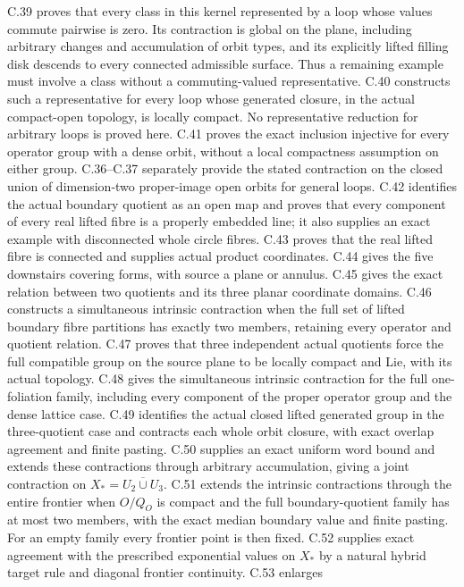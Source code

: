 C.39 proves that every class in this kernel represented by a loop
whose values commute pairwise is zero. Its contraction is global on
the plane, including arbitrary changes and accumulation of orbit types,
and its explicitly lifted filling disk descends to every connected
admissible surface. Thus a remaining example must involve a class
without a commuting-valued representative. C.40 constructs such a representative for every loop whose generated
closure, in the actual compact-open topology, is locally compact.
No representative reduction for arbitrary loops is proved here. C.41 proves the exact
inclusion injective for every operator group with a dense orbit,
without a local compactness assumption on either group. C.36--C.37 separately
provide the stated contraction on the closed union of dimension-two
proper-image open orbits for general loops. C.42 identifies the actual
boundary quotient as an open map and proves that every component of
every real lifted fibre is a properly embedded line; it also supplies
an exact example with disconnected whole circle fibres. C.43 proves
that the real lifted fibre is connected and supplies actual product
coordinates. C.44 gives the five downstairs covering forms, with
source a plane or annulus. C.45 gives the exact relation between two
quotients and its three planar coordinate domains. C.46 constructs a
simultaneous intrinsic contraction when the full set of lifted
boundary fibre partitions has exactly two members, retaining every
operator and quotient relation. C.47 proves that three independent
actual quotients force the full compatible group on the source plane
to be locally compact and Lie, with its actual topology. C.48 gives
the simultaneous intrinsic contraction for the full one-foliation
family, including every component of the proper operator group and
the dense lattice case. C.49 identifies the actual closed lifted
generated group in the three-quotient case and contracts each whole
orbit closure, with exact overlap agreement and finite pasting.
C.50 supplies an exact uniform word bound and extends these
contractions through arbitrary accumulation, giving a joint
contraction on $X_*=\overline{U_2\cup U_3}$. C.51 extends
the intrinsic contractions through the entire frontier when
$O/Q_O$ is compact and the full boundary-quotient family has
at most two members, with the exact median boundary value
and finite pasting. For an empty family every frontier point
is then fixed. C.52 supplies exact agreement with the
prescribed exponential values on $X_*$ by a natural hybrid
target rule and diagonal frontier continuity. C.53 enlarges

